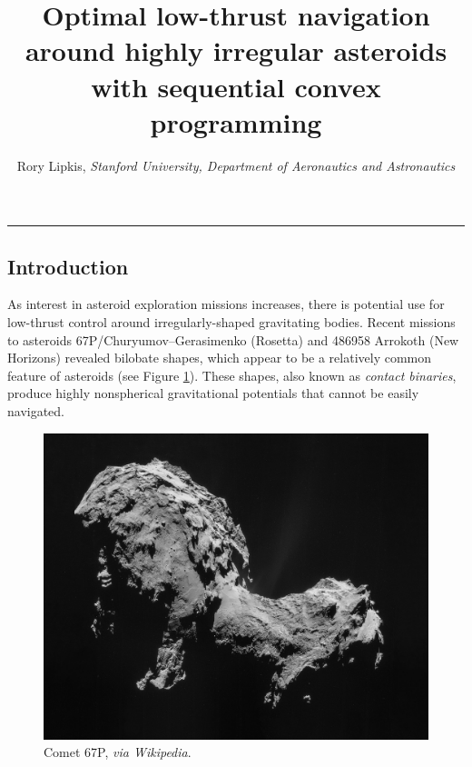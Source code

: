\documentclass{article}
\title{\textbf{Optimal low-thrust navigation around highly irregular asteroids with sequential convex programming}}
\author{Rory Lipkis, \textit{Stanford University, Department of Aeronautics and Astronautics}}
\date{}
\begin{document}
\maketitle


\noindent\rule{\linewidth}{1pt}

\begin{multicols}{2}
\section*{Introduction}
As interest in asteroid exploration missions increases, there is potential use for low-thrust control around irregularly-shaped gravitating bodies. Recent missions to asteroids 67P/Churyumov–Gerasimenko (Rosetta) and 486958 Arrokoth (New Horizons) revealed bilobate shapes, which appear to be a relatively common feature of asteroids (see Figure \ref{fig:67P}). These shapes, also known as \textit{contact binaries}, produce highly nonspherical gravitational potentials that cannot be easily navigated. 

\begin{figure}[H]
	\centering
	\includegraphics[width=0.8\linewidth]{figs/comet}
	\caption{Comet 67P, \textit{via Wikipedia}.}
	\label{fig:67P}
\end{figure}


\end{multicols}
\end{document}
